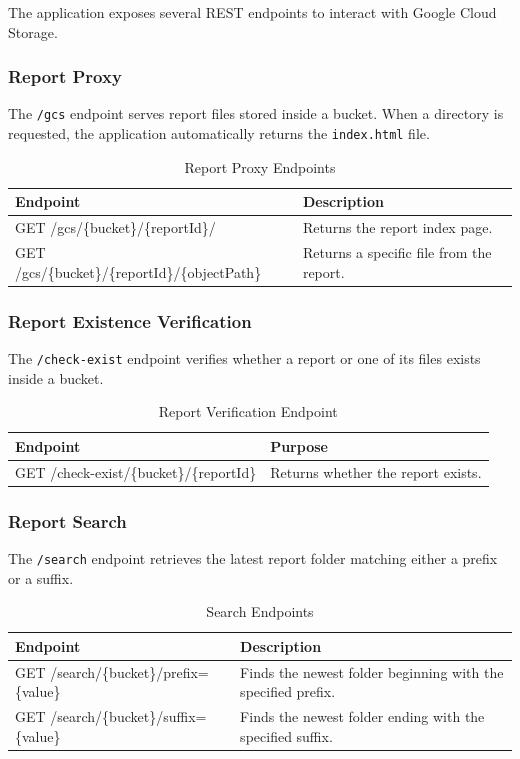 The application exposes several REST endpoints to interact with Google Cloud Storage.

\subsubsection{Report Proxy}

The \texttt{/gcs} endpoint serves report files stored inside a bucket. When a directory is requested, the application automatically returns the \texttt{index.html} file.

\begin{table}[H]
\centering
\caption{Report Proxy Endpoints}
\begin{tabular}{|p{6cm}|p{7cm}|}
\hline
\textbf{Endpoint} & \textbf{Description} \\
\hline
GET /gcs/\{bucket\}/\{reportId\}/ & Returns the report index page. \\
\hline
GET /gcs/\{bucket\}/\{reportId\}/\{objectPath\} & Returns a specific file from the report. \\
\hline
\end{tabular}
\end{table}

\subsubsection{Report Existence Verification}

The \texttt{/check-exist} endpoint verifies whether a report or one of its files exists inside a bucket.

\begin{table}[H]
\centering
\caption{Report Verification Endpoint}
\begin{tabular}{|p{6cm}|p{7cm}|}
\hline
\textbf{Endpoint} & \textbf{Purpose} \\
\hline
GET /check-exist/\{bucket\}/\{reportId\} & Returns whether the report exists. \\
\hline
\end{tabular}
\end{table}

\subsubsection{Report Search}

The \texttt{/search} endpoint retrieves the latest report folder matching either a prefix or a suffix.

\begin{table}[H]
\centering
\caption{Search Endpoints}
\begin{tabular}{|p{6cm}|p{7cm}|}
\hline
\textbf{Endpoint} & \textbf{Description} \\
\hline
GET /search/\{bucket\}/prefix=\{value\} & Finds the newest folder beginning with the specified prefix. \\
\hline
GET /search/\{bucket\}/suffix=\{value\} & Finds the newest folder ending with the specified suffix. \\
\hline
\end{tabular}
\end{table}

